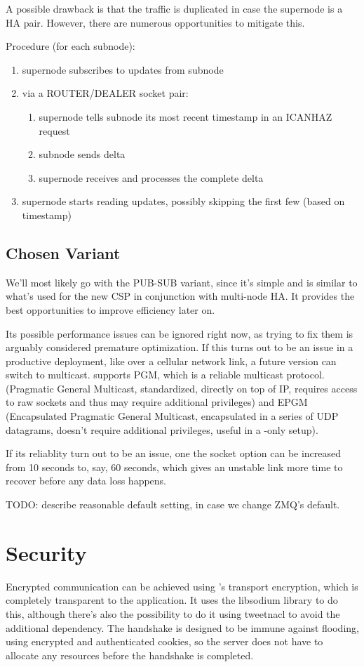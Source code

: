 A possible drawback is that the traffic is duplicated in case the supernode
is a HA pair. However, there are numerous opportunities to mitigate this.

Procedure (for each subnode):
\begin{enumerate}
	\item supernode subscribes to updates from subnode
	\item via a ROUTER/DEALER socket pair:
		\begin{enumerate}
			\item supernode tells subnode its most recent timestamp in an ICANHAZ request
			\item subnode sends delta
			\item supernode receives and processes the complete delta
		\end{enumerate}
	\item supernode starts reading updates, possibly skipping the first few (based on timestamp)
\end{enumerate}

\subsection{Chosen Variant}
We'll most likely go with the PUB-SUB variant, since it's simple and is similar to
what's used for the new \gls{CSP} in conjunction with multi-node \gls{HA}. It provides the best
opportunities to improve efficiency later on.

Its possible performance issues can be ignored right now, as trying to fix them
is arguably considered premature optimization. If this turns out to be an issue
in a productive deployment, like over a cellular network link, a future version
can switch to multicast. \zmq supports PGM, which is a reliable multicast
protocol. (Pragmatic General Multicast, standardized, directly on top of IP,
requires access to raw sockets and thus may require additional privileges) and
EPGM (Encapsulated Pragmatic General Multicast, encapsulated in a series of UDP
datagrams, doesn't require additional privileges, useful in a \zmq-only setup).

If its reliablity turn out to be an issue, one the socket option
 can be increased from 10 seconds to, say, 60 seconds, which
gives an unstable link more time to recover before any data loss happens.

TODO: describe reasonable default setting, in case we change ZMQ's default.


\section{Security}\label{sec:meth:security}
Encrypted communication can be achieved using \zmq's transport encryption,
which is completely transparent to the application. It uses the \gls{libsodium}
library to do this, although there's also the possibility to do it using
\gls{tweetnacl} to avoid the additional dependency. The handshake is designed
to be immune against flooding, using encrypted and authenticated cookies, so
the server does not have to allocate any resources before the handshake is
completed.

